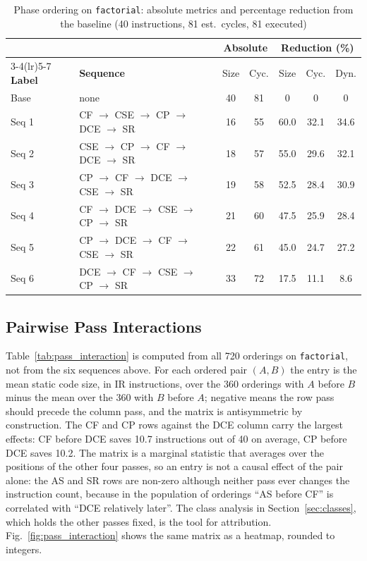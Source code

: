 \documentclass[conference]{IEEEtran}
\begin{document}
\begin{table}[!htbp]
\centering
\caption{Phase ordering on \texttt{factorial}: absolute metrics and percentage reduction from the baseline (40 instructions, 81 est.\ cycles, 81 executed)}
\label{tab:phase_order_tradeoff}
\renewcommand{\arraystretch}{1.1}
{\footnotesize
\setlength{\tabcolsep}{2.6pt}
\begin{tabular}{@{}llccccc@{}}
\toprule
 & & \multicolumn{2}{c}{\textbf{Absolute}} & \multicolumn{3}{c}{\textbf{Reduction (\%)}} \\
\cmidrule(lr){3-4}\cmidrule(lr){5-7}
\textbf{Label} & \textbf{Sequence} & Size & Cyc. & Size & Cyc. & Dyn. \\
\midrule
Base  & none & 40 & 81 & 0 & 0 & 0 \\
Seq 1 & CF $\to$ CSE $\to$ CP $\to$ DCE $\to$ SR & 16 & 55 & 60.0 & 32.1 & 34.6 \\
Seq 2 & CSE $\to$ CP $\to$ CF $\to$ DCE $\to$ SR & 18 & 57 & 55.0 & 29.6 & 32.1 \\
Seq 3 & CP $\to$ CF $\to$ DCE $\to$ CSE $\to$ SR & 19 & 58 & 52.5 & 28.4 & 30.9 \\
Seq 4 & CF $\to$ DCE $\to$ CSE $\to$ CP $\to$ SR & 21 & 60 & 47.5 & 25.9 & 28.4 \\
Seq 5 & CP $\to$ DCE $\to$ CF $\to$ CSE $\to$ SR & 22 & 61 & 45.0 & 24.7 & 27.2 \\
Seq 6 & DCE $\to$ CF $\to$ CSE $\to$ CP $\to$ SR & 33 & 72 & 17.5 & 11.1 & 8.6 \\
\bottomrule
\end{tabular}
}
\end{table}

\subsection{Pairwise Pass Interactions}
\label{sec:interaction}
Table~\ref{tab:pass_interaction} is computed from all 720 orderings on \texttt{factorial}, not from the six sequences above. For each ordered pair $(A, B)$ the entry is the mean static code size, in IR instructions, over the 360 orderings with $A$ before $B$ minus the mean over the 360 with $B$ before $A$; negative means the row pass should precede the column pass, and the matrix is antisymmetric by construction. The CF and CP rows against the DCE column carry the largest effects: CF before DCE saves 10.7 instructions out of 40 on average, CP before DCE saves 10.2. The matrix is a marginal statistic that averages over the positions of the other four passes, so an entry is not a causal effect of the pair alone: the AS and SR rows are non-zero although neither pass ever changes the instruction count, because in the population of orderings ``AS before CF'' is correlated with ``DCE relatively later''. The class analysis in Section~\ref{sec:classes}, which holds the other passes fixed, is the tool for attribution. Fig.~\ref{fig:pass_interaction} shows the same matrix as a heatmap, rounded to integers.
\end{document}
